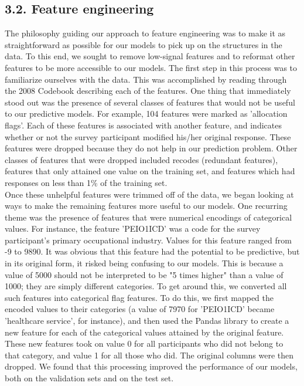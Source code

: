 \subsection*{3.2. Feature engineering}
The philosophy guiding our approach to feature engineering was to make it as straightforward as possible for our models to pick up on the structures in the data. To this end, we sought to remove low-signal features and to reformat other features to be more accessible to our models. The first step in this process was to familiarize ourselves with the data. This was accomplished by reading through the 2008 Codebook describing each of the features. One thing that immediately stood out was the presence of several classes of features that would not be useful to our predictive models. For example,  104 features were marked as 'allocation flags'. Each of these features is associated with another feature, and indicates whether or not the survey participant modified his/her original response. These features were dropped because they do not help in our prediction problem. Other classes of features that were dropped included recodes (redundant features), features that only attained one value on the training set, and features which had responses on less than 1\% of the training set.\\

Once these unhelpful features were trimmed off of the data, we began looking at ways to make the remaining features more useful to our models. One recurring theme was the presence of features that were numerical encodings of categorical values. For instance, the feature 'PEIO1ICD' was a code for the survey participant's primary occupational industry. Values for this feature ranged from -9 to 9890. It was obvious that this feature had the potential to be predictive, but in its original form, it risked being confusing to our models. This is because a value of 5000 should not be interpreted to be "5 times higher" than a value of 1000; they are simply different categories. To get around this, we converted all such features into categorical flag features. To do this, we first mapped the encoded values to their categories (a value of 7970 for 'PEIO1ICD' became 'healthcare service', for instance), and then used the Pandas library to create a new feature for each of the categorical values attained by the original feature. These new features took on value 0 for all participants who did not belong to that category, and value 1 for all those who did. The original columns were then dropped. We found that this processing improved the performance of our models, both on the validation sets and on the test set.

